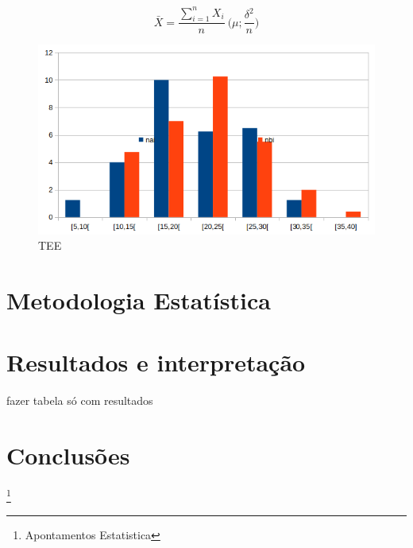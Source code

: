 \[\bar{X}=\frac{\sum_{i=1}^nX_i}{n}~\big(\mu;\frac{\delta^2}{n}\big)\]



\begin{figure}[H]
\centering
\includegraphics[scale=0.8]{./image/first.png}
\caption{TEE}
\label{TEE}
\end{figure}\par



\section{Metodologia Estatística}\label{Metodos}
\section{Resultados e interpretação}\label{Resultados}
fazer tabela só com resultados\\
\section{Conclusões}\label{Conclusão}


%
%
%
\listoffigures
\cite{*}

\footnote{Apontamentos Estatistica}

